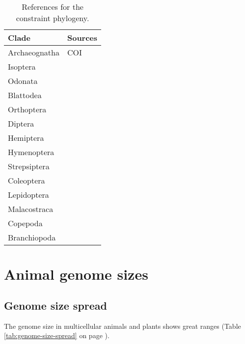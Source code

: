 \begin{table}[h]
\centering
\caption[Literature sources for the constraint phylogeny]{References for the constraint phylogeny.}
\label{tab:phylogeny-sources}
\begin{tabular}{@{}ll@{}}
\toprule
Clade         & Sources \\
\midrule
Archaeognatha & COI \\
Isoptera      & \citet{Cameron2012} \\
Odonata       & \citet{Letsch2016} \\
Blattodea     & \citet{Wang2017}    \\
Orthoptera    & \citet{Zhang2013a}   \\
Diptera       & \citet{Wiegmann2011,Cranston2011} \\
Hemiptera     & \citet{Song2012,Ortiz-Rivas2010,Novakova2013} \\
Hymenoptera   & \citet{Peters2017,Branstetter2017,Ward2015} \\
Strepsiptera  & \citet{Pohl2005} \\
Coleoptera    & \citet{McKenna2015,Ahrens2014,Magro2010,Kergoat2014,Hundsdoerfer2009} \\
Lepidoptera   & \citet{Breinholt2018,Regier2013,Kawahara2009,Mitchell2005,Abraham2001} \\
\midrule
Malacostraca  & \citet{Tsang2008,Ahyong2004} \\
Copepoda      & \citet{Eyun2017a,Blanco-Bercial2011,Figueroa2011,Thum2004} \\
Branchiopoda  & \citet{Richter2007} \\
\bottomrule
\end{tabular}
\end{table}

\section{Animal genome sizes}

\subsection{Genome size spread}

The genome size in multicellular animals and plants shows great ranges (Table \ref{tab:genome-size-spread} on page \pageref{tab:genome-size-spread}).

